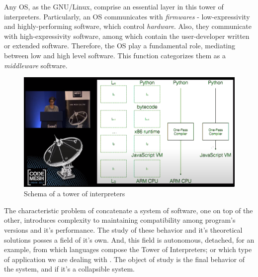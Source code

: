 \documentclass[
12pt,				%
openright,			%
oneside,			%
a4paper,			%
brazil,				%
english,			%
]{abntex2}
\begin{document}
Any OS, as the GNU/Linux, comprise an essential layer in this tower of
interpreters. Particularly, an OS communicates with \textit{firmwares}
- low-expressivity and highly-performing software, which control
\textit{hardware}. Also, they communicate with high-expressivity
software, among which contain the user-developer written or extended
software. Therefore, the OS play a fundamental role, mediating between
low and high level software. This function categorizes them as a
\textit{middleware} software.     

\begin{figure}[ht]
  \centering
  \caption{\label{fig:tower} Schema of a tower of interpreters}
  \includegraphics[width=\linewidth]{torres.png}
\end{figure}

The characteristic problem of concatenate a system of software, one on
top of the other, introduces complexity to maintaining compatibility
among program's versions and it's performance. The study of these
behavior and it's theoretical solutions posses a field of it's
own. And, this field is autonomous, detached, for an example, from
which languages compose the Tower of Interpreters; or which type of
application we are dealing with \cite{amin2017towers}. The object of
study is the final behavior of the system, and if it's a collapsible system. 
\end{document}
